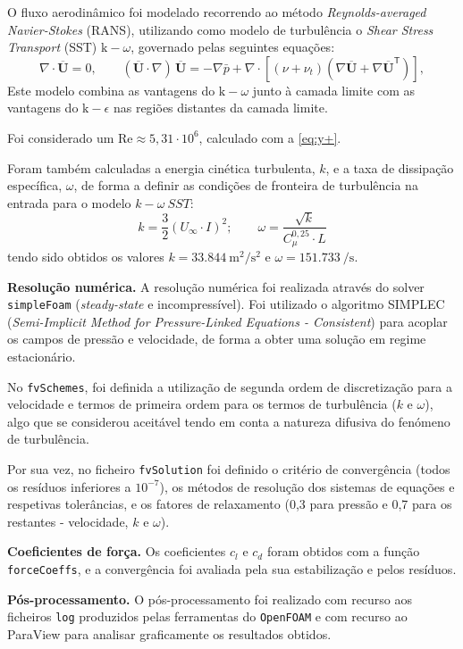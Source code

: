 \begin{etapas}
  O fluxo aerodinâmico foi modelado recorrendo ao método \textit{Reynolds-averaged Navier-Stokes} (RANS), utilizando como modelo de turbulência o \textit{Shear Stress Transport} (SST) $\mathrm{k-}\omega$, governado pelas seguintes equações:
  \[
    \nabla\cdot\overline{\mathbf{U}} = 0, \qquad
    (\overline{\mathbf{U}}\cdot\nabla)\,\overline{\mathbf{U}} =
    -\nabla \bar{p} + \nabla\cdot\left[(\nu + \nu_t)
    \left(\nabla\overline{\mathbf{U}} + \nabla\overline{\mathbf{U}}^{\mathsf{T}}\right)\right],
  \]
  Este modelo combina as vantagens do $\mathrm{k-}\omega$ junto à camada limite com as vantagens do $\mathrm{k-}\epsilon$ nas regiões distantes da camada limite.

  Foi considerado um $\mathrm{Re}\approx5{,}31\cdot10^6$, calculado com a \cref{eq:y+}.

  Foram também calculadas a energia cinética turbulenta, $k$, e a taxa de dissipação específica, $\omega$, de forma a definir as condições de fronteira de turbulência na entrada para o modelo $k-\omega\ SST$:
  \[
      k = \frac{3}{2}(U_\infty \cdot I)^2; \qquad \omega = \frac{\sqrt{k}}{C_\mu^{0{,}25} \cdot L}
  \]
  tendo sido obtidos os valores $k=\SI{33.844}{\meter^2\per\second^2}$ e $\omega=\SI{151.733}{\per\second}$.

    
  \item \textbf{Resolução numérica.} A resolução numérica foi realizada através do solver \texttt{simpleFoam} (\textit{steady-state} e incompressível). Foi utilizado o algoritmo SIMPLEC (\textit{Semi-Implicit Method for Pressure-Linked Equations - Consistent}) para acoplar os campos de pressão e velocidade, de forma a obter uma solução em regime estacionário.
  
  No \texttt{fvSchemes}, foi definida a utilização de segunda ordem de discretização para a velocidade e termos de primeira ordem para os termos de turbulência ($k$ e $\omega$), algo que se considerou aceitável tendo em conta a natureza difusiva do fenómeno de turbulência.
  
  Por sua vez, no ficheiro \texttt{fvSolution} foi definido o critério de convergência (todos os resíduos inferiores a $10^{-7}$), os métodos de resolução dos sistemas de equações e respetivas tolerâncias, e os fatores de relaxamento (0,3 para pressão e 0,7 para os restantes - velocidade, $k$ e $\omega$).

  \item \textbf{Coeficientes de força.} Os coeficientes $c_l$ e $c_d$ foram obtidos com a função \texttt{forceCoeffs}, e a convergência foi avaliada pela sua estabilização e pelos resíduos.

  \item \textbf{Pós-processamento.} O pós-processamento foi realizado com recurso aos ficheiros \texttt{log} produzidos pelas ferramentas do \texttt{OpenFOAM} e com recurso ao ParaView para analisar graficamente os resultados obtidos.
\end{etapas}

